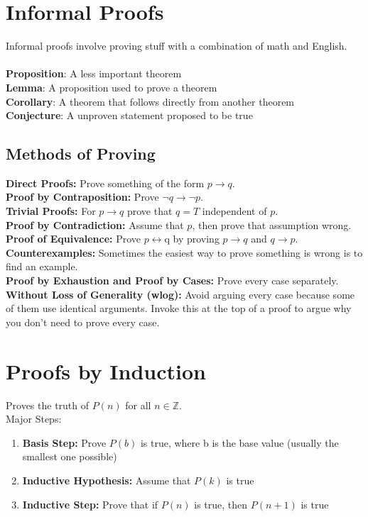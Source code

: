 \documentclass[letter]{article}
\begin{document}
\begin{multicols}{2}

	\section{Informal Proofs}
	Informal proofs involve proving stuff with a combination of math and English.\\\\
	\textbf{Proposition}: A less important theorem\\
	\textbf{Lemma}: A proposition used to prove a theorem\\
	\textbf{Corollary}: A theorem that follows directly from another theorem\\
	\textbf{Conjecture}: A unproven statement proposed to be true\\

	\subsection{Methods of Proving}
	\textbf{Direct Proofs:} Prove something of the form $p \rightarrow q$.\\
	\textbf{Proof by Contraposition:} Prove $\neg q \rightarrow \neg p$.\\
	\textbf{Trivial Proofs:} For $p \rightarrow q$ prove that $q = T$ independent of $p$.\\
	\textbf{Proof by Contradiction:} Assume that $p$, then prove that assumption wrong.\\
	\textbf{Proof of Equivalence:} Prove $p \leftrightarrow $q by proving 
	$p \rightarrow q$ and $q \rightarrow p$.\\
	\textbf{Counterexamples:} Sometimes the easiest way to prove something is 
	wrong is to find an example.\\
	\textbf{Proof by Exhaustion and Proof by Cases:} Prove every case separately.\\
	\textbf{Without Loss of Generality (wlog):} Avoid arguing every case 
	because some of them use identical arguments. Invoke this at the top 
	of a proof to argue why you don't need to prove every case.
	

	\section{Proofs by Induction}
	Proves the truth of $P(n)$ for all $n \in \mathbb{Z}$.\\
	Major Steps:
	\begin{enumerate}
		\item \textbf{Basis Step:} Prove $P(b)$ is true, where b is the base 
		value (usually the smallest one possible)
		\item \textbf{Inductive Hypothesis:} Assume that $P(k)$ is true
		\item \textbf{Inductive Step:} Prove that if $P(n)$ is true, then 
		$P(n + 1)$ is true
	\end{enumerate}
	

\end{multicols}
\end{document}
